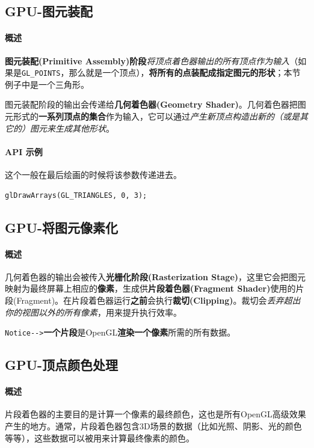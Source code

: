 \documentclass[UTF8,a4paper,12pt]{ctexbook}
\begin{document}
				
				
		\subsection{GPU-图元装配}
			\paragraph{概述}		
				\textbf{图元装配(Primitive Assembly)阶段}\textit{将顶点着色器输出的所有顶点作为输入}（如果是\verb|GL_POINTS|，那么就是一个顶点），\textbf{将所有的点装配成指定图元的形状}；本节例子中是一个三角形。
			
				图元装配阶段的输出会传递给\textbf{几何着色器(Geometry Shader)}。几何着色器把图元形式的\textbf{一系列顶点的集合}作为输入，它可以通过\textit{产生新顶点构造出新的（或是其它的）图元来生成其他形状}。
			
			\paragraph{API 示例}
				这个一般在最后绘画的时候将该参数传递进去。
				
				\begin{lstlisting}
glDrawArrays(GL_TRIANGLES, 0, 3);				
				\end{lstlisting}
				
		
		\subsection{GPU-将图元像素化}
			\paragraph{概述}		
				几何着色器的输出会被传入\textbf{光栅化阶段(Rasterization Stage)}，这里它会把图元映射为最终屏幕上相应的\textbf{像素}，生成供\textbf{片段着色器(Fragment Shader)}使用的片段(Fragment)。在片段着色器运行\textbf{之前}会执行\textbf{裁切(Clipping)}。裁切会\textit{丢弃超出你的视图以外的所有像素}，用来提升执行效率。
				
				\verb|Notice-->|\textbf{一个片段}是OpenGL\textbf{渲染一个像素}所需的所有数据。
			
			
		\subsection{GPU-顶点颜色处理}
			\paragraph{概述}		
				片段着色器的主要目的是计算一个像素的最终颜色，这也是所有OpenGL高级效果产生的地方。通常，片段着色器包含3D场景的数据（比如光照、阴影、光的颜色等等），这些数据可以被用来计算最终像素的颜色。
				
\end{document}
